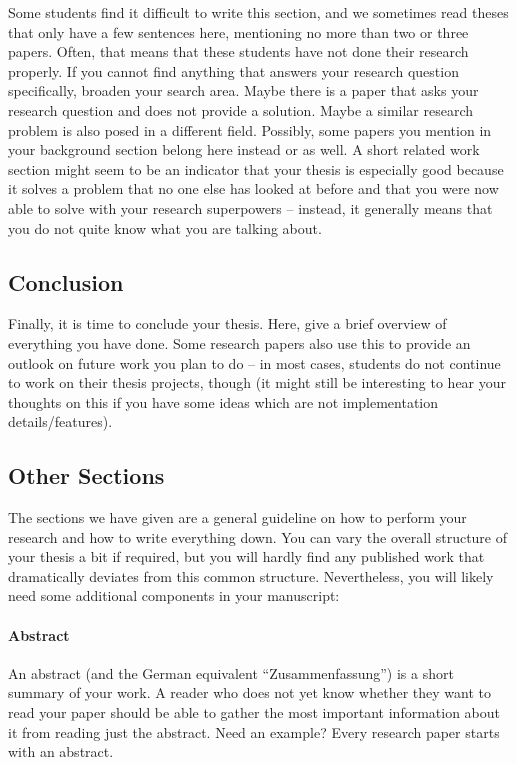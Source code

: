 \documentclass[a4]{article}
\begin{document}
Some students find it difficult to write this section, and we sometimes read theses that only have a few sentences here, mentioning no more than two or three papers.
Often, that means that these students have not done their research properly.
If you cannot find anything that answers your research question specifically, broaden your search area.
Maybe there is a paper that asks your research question and does not provide a solution.
Maybe a similar research problem is also posed in a different field.
Possibly, some papers you mention in your background section belong here instead or as well.
A short related work section might seem to be an indicator that your thesis is especially good because it solves a problem that no one else has looked at before and that you were now able to solve with your research superpowers -- instead, it generally means that you do not quite know what you are talking about.

\subsection{Conclusion}

Finally, it is time to conclude your thesis.
Here, give a brief overview of everything you have done.
Some research papers also use this to provide an outlook on future work you plan to do -- in most cases, students do not continue to work on their thesis projects, though (it might still be interesting to hear your thoughts on this if you have some ideas which are not implementation details/features).

\subsection{Other Sections}

The sections we have given are a general guideline on how to perform your research and how to write everything down.
You can vary the overall structure of your thesis a bit if required, but you will hardly find any published work that dramatically deviates from this common structure.
Nevertheless, you will likely need some additional components in your manuscript:

\paragraph{Abstract}

An abstract (and the German equivalent ``Zusammenfassung'') is a short summary of your work.
A reader who does not yet know whether they want to read your paper should be able to gather the most important information about it from reading just the abstract.
Need an example? Every research paper starts with an abstract.
\end{document}
